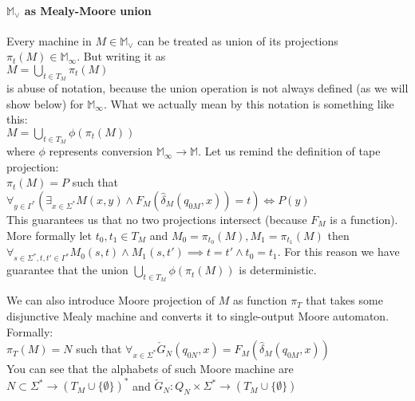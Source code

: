 \documentclass[12pt]{article}
\begin{document}
 \paragraph{$\mathbb{M}_\vee$ as Mealy-Moore union}
 Every machine in $M\in\mathbb{M}_\vee$ can be treated as union  of its projections $\pi_t(M) \in \mathbb{M}_\infty$. But writing it as \\
 $M = \bigcup_{t\in T_M} \pi_t(M)$ \\
 is abuse of notation, because the union operation is not always defined (as we will show below) for $\mathbb{M}_\infty$. What we actually mean by this notation is something like this: \\
 $M = \bigcup_{t\in T_M} \phi(\pi_t(M))$ \\
 where $\phi$ represents conversion $\mathbb{M}_\infty \rightarrow \mathbb{M}$. Let us remind the definition of tape projection: \\
 $\pi_t(M) = P$ such that $\forall_{y\in\Gamma^*} (\exists_{x\in\Sigma^*} M(x,y) \wedge F_M(\hat{\delta}_M(q_{0M},x))=t) \iff P(y)$ \\
 This guarantees us that no two projections intersect (because $F_M$ is a function). More formally let $t_0, t_1 \in T_M$ and $M_0 = \pi_{t_0}(M), M_1=\pi_{t_1}(M)$ then $\forall_{s\in\Sigma^*,t,t'\in\Gamma^*} M_0(s,t) \wedge M_1(s,t') \implies t=t' \wedge t_0 = t_1$. For this reason we have guarantee that the union $ \bigcup_{t\in T_M} \phi(\pi_t(M))$ is deterministic.
 
 We can also introduce Moore projection of $M$ as function $\pi_T $ that takes some disjunctive Mealy machine and converts it to single-output Moore automaton. Formally: \\
 $\pi_T(M) = N$ such that $\forall_{x\in\Sigma^*} \check{G}_N(q_{0N},x) = F_M(\hat{\delta}_M(q_{0M},x))$ \\
 You can see that the alphabets of such Moore machine are $N \subset \Sigma^* \rightarrow (T_M \cup \{\emptyset\})^*$ and $\check{G}_N : Q_N \times \Sigma^* \rightarrow (T_M \cup \{\emptyset\})$
 
\end{document}
